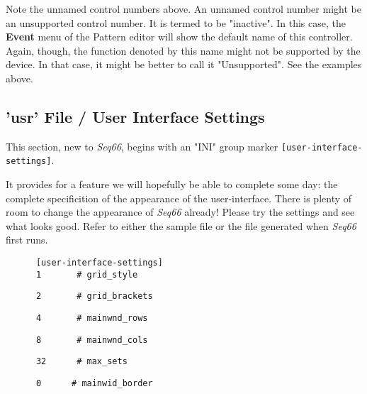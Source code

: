    Note the unnamed control numbers above.
   An unnamed control number might be an unsupported control number.
   It is termed to be "inactive".  In this case, the \textbf{Event} menu of
   the Pattern editor will show the default name of this controller.
   Again, though, the function denoted by this name might not be supported by
   the device.  In that case, it might be better to call it "Unsupported".
   See the examples above.

\subsection{'usr' File / User Interface Settings}
\label{subsec:usr_file_user_interface_settings}

   This section, new to \textsl{Seq66}, begins with an
   "INI" group marker \texttt{[user-interface-settings]}.

   It provides for a feature we will hopefully be able to complete some day:
   the complete specificition of the appearance of the user-interface.
   There is plenty of room to change the appearance of
   \textsl{Seq66} already!  Please try the settings and see what looks good.
   Refer to either the sample file or the file generated when \textsl{Seq66} first
   runs.

   \begin{verbatim}
      [user-interface-settings]
      1       # grid_style
   \end{verbatim}

   \begin{verbatim}
      2       # grid_brackets
   \end{verbatim}

   \begin{verbatim}
      4       # mainwnd_rows
   \end{verbatim}

   \begin{verbatim}
      8       # mainwnd_cols
   \end{verbatim}

   \begin{verbatim}
      32      # max_sets
   \end{verbatim}

   \begin{verbatim}
      0      # mainwid_border
   \end{verbatim}


